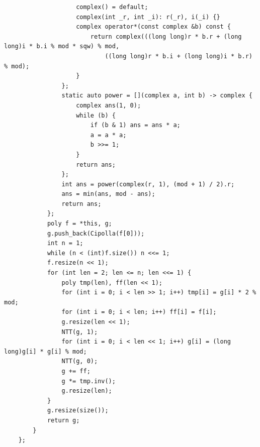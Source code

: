 \begin{verbatim}
                    complex() = default;
                    complex(int _r, int _i): r(_r), i(_i) {}
                    complex operator*(const complex &b) const {
                        return complex(((long long)r * b.r + (long long)i * b.i % mod * sqw) % mod,
                            ((long long)r * b.i + (long long)i * b.r) % mod);
                    }
                };
                static auto power = [](complex a, int b) -> complex {
                    complex ans(1, 0);
                    while (b) {
                        if (b & 1) ans = ans * a;
                        a = a * a;
                        b >>= 1;
                    }
                    return ans;
                };
                int ans = power(complex(r, 1), (mod + 1) / 2).r;
                ans = min(ans, mod - ans);
                return ans;
            };
            poly f = *this, g;
            g.push_back(Cipolla(f[0]));
            int n = 1;
            while (n < (int)f.size()) n <<= 1;
            f.resize(n << 1);
            for (int len = 2; len <= n; len <<= 1) {
                poly tmp(len), ff(len << 1);
                for (int i = 0; i < len >> 1; i++) tmp[i] = g[i] * 2 % mod;
                for (int i = 0; i < len; i++) ff[i] = f[i];
                g.resize(len << 1);
                NTT(g, 1);
                for (int i = 0; i < len << 1; i++) g[i] = (long long)g[i] * g[i] % mod;
                NTT(g, 0);
                g += ff;
                g *= tmp.inv();
                g.resize(len);
            }
            g.resize(size());
            return g;
        }
    };


\end{verbatim}
